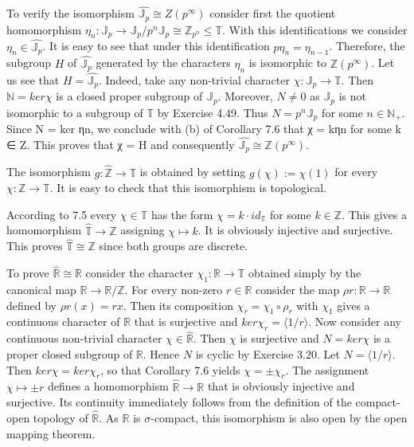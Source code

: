 \documentclass[12pt]{article}
\begin{document}
\begin{itemize}
\begin{itemize}
    To verify the isomorphism $\hat{\mathbb{J}_p} \cong Z(p^{\infty})$ consider first the quotient homomorphism $\eta_n : \mathbb{J}_p \to \mathbb{J}_p / p^n \mathbb{J}_p\cong \mathbb{Z}_{p^n} \leq \mathbb{T}$.
With this identifications we consider $\eta_n \in \hat{\mathbb{J}_p}$. It is easy to see that under this identification $p\eta_n = \eta_{n-1}$.
Therefore, the subgroup $H$ of $\hat{\mathbb{J}_p}$ generated by the characters $\eta_n$ is isomorphic to $\mathbb{Z}(p^\infty)$. Let us see that $H = \hat{\mathbb{J}_p}$.
Indeed, take any non-trivial character $\chi : \mathbb{J}_p \to \mathbb{T}$. Then $\mathbb{N} = ker \chi$ is a closed proper subgroup of $\mathbb{J}_p$. Moreover,
$N \neq 0$ as $\mathbb{J}_p$ is not isomorphic to a subgroup of $\mathbb{T}$ by Exercise 4.49. Thus $N = p^n \mathbb{J}_p$ for some $n \in \mathbb{N}_+$. Since
N = ker ηn, we conclude with (b) of Corollary 7.6 that χ = kηn for some k ∈ Z. This proves that χ = H and
consequently $\hat{\mathbb{J}_p} \cong \mathbb{Z}(p^{\infty})$.


    The isomorphism $g : \mathbb{\hat{Z}} \to \mathbb{T}$ is obtained by setting $g(\chi) := \chi(1)$ for every $\chi : \mathbb{Z} \to \mathbb{T}$. It is easy to check that
this isomorphism is topological.


    According to 7.5 every $\chi \in \mathbb{T}$ has the form $\chi = k · id_{\mathbb{T}}$ for some $k \in \mathbb{Z}$. This gives a homomorphism $\hat{\mathbb{T}} \to \mathbb{Z}$
assigning $\chi \mapsto k$. It is obviously injective and surjective. This proves $\hat{\mathbb{T}} \cong \mathbb{Z}$ since both groups are discrete.


    To prove $\hat{\mathbb{R}} \cong \mathbb{R}$ consider the character $\chi_1 : \mathbb{R} \to \mathbb{T}$ obtained simply by the canonical map $\mathbb{R} \to \mathbb{R} / \mathbb{Z}$. For
every non-zero $r \in \mathbb{R}$ consider the map $\rho r : \mathbb{R} \to \mathbb{R}$ defined by $\rho r(x) = rx$. Then its composition $\chi_r = \chi_1 \circ \rho_r$
with $\chi_1$ gives a continuous character of $\mathbb{R}$ that is surjective and $ker \chi_r = \langle 1/r \rangle$. Now consider any continuous
non-trivial character $\chi \in \hat{\mathbb{R}}$. Then $\chi$ is surjective and $N = ker \chi$ is a proper closed subgroup of $\mathbb{R}$. Hence $N$
is cyclic by Exercise 3.20. Let $N = \langle 1/r \rangle$. Then $ker \chi = ker \chi_r$, so that Corollary 7.6 yields $\chi = \pm \chi_r$. The
assignment $\chi \mapsto \pm r$ defines a homomorphism $\hat{\mathbb{R}} \to \mathbb{R}$ that is obviously injective and surjective. Its continuity
immediately follows from the definition of the compact-open topology of $\hat{\mathbb{R}}$. As $\mathbb{R}$ is $\sigma$-compact, this isomorphism
is also open by the open mapping theorem.



\end{itemize}
\end{itemize}
\end{document}
